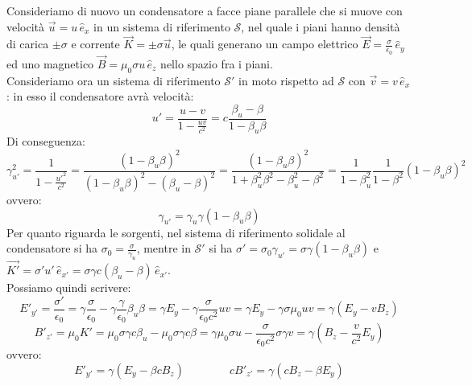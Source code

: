 \documentclass[]{article}
\begin{document}
Consideriamo di nuovo un condensatore a facce piane parallele che si muove con velocità $ \vec{u} = u \,\hat{e}_x $ in un sistema di riferimento $ \mathcal{S} $, nel quale i piani hanno densità di carica $ \pm\sigma $ e corrente $ \vec{K} = \pm\sigma\vec{u} $, le quali generano un campo elettrico $ \vec{E} = \frac{\sigma}{\epsilon_0} \,\hat{e}_y $ ed uno magnetico $ \vec{B} = \mu_0 \sigma u\,\hat{e}_z $ nello spazio fra i piani. \\ 
%
Consideriamo ora un sistema di riferimento $ \mathcal{S}' $ in moto rispetto ad $ \mathcal{S} $ con $ \vec{v} = v \,\hat{e}_x $: in esso il condensatore avrà velocità:
\begin{equation}
	u' = \frac{u - v}{1 - \frac{uv}{c^2}} = c \frac{\beta_u - \beta}{1 - \beta_u\beta}
	\label{eq:39}
\end{equation}
Di conseguenza:
\begin{equation}
	\gamma_{u'}^2 = \frac{1}{1 - \frac{u'^2}{c^2}} = \frac{(1 - \beta_u\beta)^2}{(1-\beta_u\beta)^2 - (\beta_u-\beta)^2} = \frac{(1-\beta_u\beta)^2}{1 + \beta_u^2\beta^2-\beta_u^2-\beta^2} = \frac{1}{1-\beta_u^2}\frac{1}{1-\beta^2}(1-\beta_u\beta)^2
	\label{eq:40}
\end{equation}
ovvero:
\begin{equation}
	\gamma_{u'} = \gamma_u\gamma(1-\beta_u\beta)
	\label{eq:41}
\end{equation}
Per quanto riguarda le sorgenti, nel sistema di riferimento solidale al condensatore si ha $ \sigma_0 = \frac{\sigma}{\gamma_u} $, mentre in $ \mathcal{S}' $ si ha $ \sigma' = \sigma_0\gamma_{u'} = \sigma\gamma(1-\beta_u\beta) $ e $ \vec{K'} = \sigma'u'\,\hat{e}_{x'} = \sigma\gamma c(\beta_u-\beta)\,\hat{e}_{x'} $. \\ 
%
Possiamo quindi scrivere:
\begin{equation}
	E'_{y'} = \frac{\sigma'}{\epsilon_0} = \gamma \frac{\sigma}{\epsilon_0} - \gamma \frac{\gamma}{\epsilon_0}\beta_u\beta = \gamma E_y - \gamma \frac{\sigma}{\epsilon_0 c^2} uv = \gamma E_y - \gamma \sigma \mu_0 uv = \gamma (E_y - vB_z)
	\label{eq:42}
\end{equation}
\begin{equation}
	B'_{z'} = \mu_0 K' = \mu_0 \sigma \gamma c \beta_u - \mu_0 \sigma \gamma c \beta = \gamma \mu_0 \sigma u - \frac{\sigma}{\epsilon_0 c^2} \sigma \gamma v = \gamma (B_z - \frac{v}{c^2} E_y)
	\label{eq:43}
\end{equation}
ovvero:
\begin{equation}
	E'_{y'} = \gamma (E_y - \beta cB_z) \qquad\qquad cB'_{z'} = \gamma (cB_z - \beta E_y)
	\label{eq:44}
\end{equation}
\end{document}
